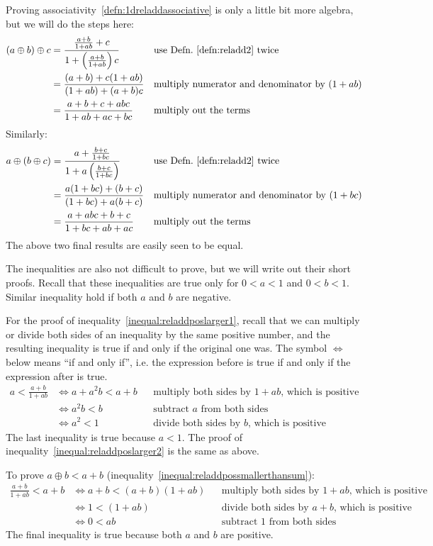 \documentclass[a4paper]{article}
\theoremstyle{plain}
\theoremstyle{definition}
\begin{document}
Proving associativity~\eqref{defn:1dreladdassociative} is only a
little bit more algebra, but we will do the steps here:
\begin{align*}
(a \oplus b) \oplus c
  & = \frac{\frac{a+b}{1+ab}+c}{1+\left(\frac{a+b}{1+ab}\right)c} & & \text{use Defn.~\eqref{defn:reladd2} twice} \\
  & = \frac{(a+b)+c(1+ab)}{(1+ab)+(a+b)c} & & \text{multiply numerator and denominator by $(1+ab)$} \\
  & = \frac{a+b+c+abc}{1+ab+ac+bc} & & \text{multiply out the terms}
\end{align*}
Similarly:
\begin{align*}
a \oplus (b \oplus c)
  & = \frac{a+\frac{b+c}{1+bc}}{1+a\left(\frac{b+c}{1+bc}\right)} & & \text{use Defn.~\eqref{defn:reladd2} twice} \\
  & = \frac{a(1+bc)+(b+c)}{(1+bc)+a(b+c)} & & \text{multiply numerator and denominator by $(1+bc)$} \\
  & = \frac{a+abc+b+c}{1+bc+ab+ac} & & \text{multiply out the terms}
\end{align*}
The above two final results are easily seen to be equal.

The inequalities are also not difficult to prove, but we will write
out their short proofs.  Recall that these inequalities are true only
for $0 < a < 1$ and $0 < b < 1$.  Similar inequality hold if both $a$
and $b$ are negative.

For the proof of inequality~\eqref{inequal:reladdposlarger1}, recall
that we can multiply or divide both sides of an inequality by the same
positive number, and the resulting inequality is true if and only if
the original one was.  The symbol $\Leftrightarrow$ below means ``if
and only if'', i.e. the expression before is true if and only if the
expression after is true.
\begin{align*}
a < \frac{a+b}{1+ab}
  & \Leftrightarrow a + a^2 b < a+b & & \text{multiply both sides by $1+ab$, which is positive} \\
  & \Leftrightarrow a^2 b < b & & \text{subtract $a$ from both sides} \\
  & \Leftrightarrow a^2 < 1 & & \text{divide both sides by $b$, which is positive}
\end{align*}
The last inequality is true because $a < 1$.
The proof of inequality~\eqref{inequal:reladdposlarger2} is the same
as above.

To prove $a \oplus b < a+b$
(inequality~\eqref{inequal:reladdpossmallerthansum}):
\begin{align*}
\frac{a+b}{1+ab} < a+b
  & \Leftrightarrow a+b < (a+b)(1+ab) & & \text{multiply both sides by $1+ab$, which is positive} \\
  & \Leftrightarrow 1 < (1+ab) & & \text{divide both sides by $a+b$, which is positive} \\
  & \Leftrightarrow 0 < ab & & \text{subtract 1 from both sides}
\end{align*}
The final inequality is true because both $a$ and $b$ are positive.
\end{document}
